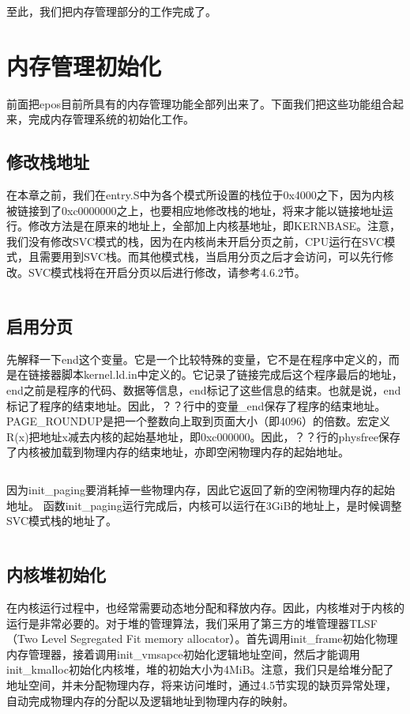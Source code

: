 \documentclass[main.tex]{subfiles}
\begin{document}
\begin{CJK*}{UTF8}{song}
\inputminted[firstline=245,lastline=354,linenos,numbersep=5pt,frame=lines,framesep=2mm]{c}{chapter04/kernel/machdep.c}

至此，我们把内存管理部分的工作完成了。

\section{内存管理初始化}
前面把epos目前所具有的内存管理功能全部列出来了。下面我们把这些功能组合起来，完成内存管理系统的初始化工作。
\subsection{修改栈地址}
在本章之前，我们在entry.S中为各个模式所设置的栈位于0x4000之下，因为内核被链接到了0xc0000000之上，也要相应地修改栈的地址，将来才能以链接地址运行。修改方法是在原来的地址上，全部加上内核基地址，即KERNBASE。注意，我们没有修改SVC模式的栈，因为在内核尚未开启分页之前，CPU运行在SVC模式，且需要用到SVC栈。而其他模式栈，当启用分页之后才会访问，可以先行修改。SVC模式栈将在开启分页以后进行修改，请参考4.6.2节。

\inputminted[firstline=125,lastline=142,linenos,numbersep=5pt,frame=lines,framesep=2mm]{gas}{chapter04/kernel/entry.S}

\subsection{启用分页}
先解释一下end这个变量。它是一个比较特殊的变量，它不是在程序中定义的，而是在链接器脚本kernel.ld.in中定义的。它记录了链接完成后这个程序最后的地址，end之前是程序的代码、数据等信息，end标记了这些信息的结束。也就是说，end标记了程序的结束地址。因此，？？行中的变量\_end保存了程序的结束地址。PAGE\_ROUNDUP是把一个整数向上取到页面大小（即4096）的倍数。宏定义R(x)把地址x减去内核的起始基地址，即0xc000000。因此，？？行的physfree保存了内核被加载到物理内存的结束地址，亦即空闲物理内存的起始地址。
\inputminted[firstline=368,lastline=373,linenos,numbersep=5pt,frame=lines,framesep=2mm]{c}{chapter04/kernel/machdep.c}
因为init\_paging要消耗掉一些物理内存，因此它返回了新的空闲物理内存的起始地址。
函数init\_paging运行完成后，内核可以运行在3GiB的地址上，是时候调整SVC模式栈的地址了。

\inputminted[firstline=375,lastline=378,linenos,numbersep=5pt,frame=lines,framesep=2mm]{c}{chapter04/kernel/machdep.c}

\subsection{内核堆初始化}
在内核运行过程中，也经常需要动态地分配和释放内存。因此，内核堆对于内核的运行是非常必要的。对于堆的管理算法，我们采用了第三方的堆管理器TLSF（Two Level Segregated Fit memory allocator）。首先调用init\_frame初始化物理内存管理器，接着调用init\_vmsapce初始化逻辑地址空间，然后才能调用init\_kmalloc初始化内核堆，堆的初始大小为4MiB。注意，我们只是给堆分配了地址空间，并未分配物理内存，将来访问堆时，通过4.5节实现的缺页异常处理，自动完成物理内存的分配以及逻辑地址到物理内存的映射。


\end{CJK*}
\end{document}
